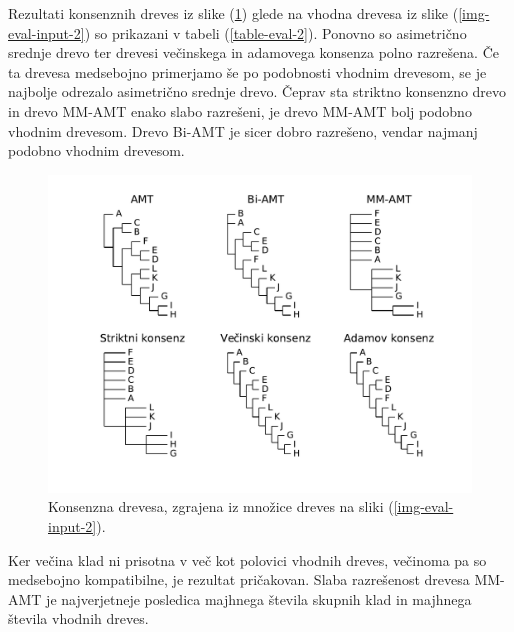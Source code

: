 \documentclass[a4paper, 12pt]{book}
\begin{document}
Rezultati konsenznih dreves iz slike (\ref{img-eval-result-2}) glede na vhodna drevesa iz slike (\ref{img-eval-input-2}) so prikazani v tabeli (\ref{table-eval-2}). Ponovno so asimetrično srednje drevo ter drevesi večinskega in adamovega konsenza polno razrešena. Če ta drevesa medsebojno primerjamo še po podobnosti vhodnim drevesom, se je najbolje odrezalo asimetrično srednje drevo. Čeprav sta striktno konsenzno drevo in drevo MM-AMT enako slabo razrešeni, je drevo MM-AMT bolj podobno vhodnim drevesom. Drevo Bi-AMT je sicer dobro razrešeno, vendar 
najmanj podobno vhodnim drevesom. 

\begin{figure}[h!]
	\begin{center}
		\includegraphics[scale=0.65, clip=true, trim=1.5cm 1.5cm 1cm 0.8cm]{gfx/eval_gfx_2.pdf}
	\end{center}
	\caption{Konsenzna drevesa, zgrajena iz množice dreves na sliki (\ref{img-eval-input-2}).}
	\label{img-eval-result-2}
\end{figure}

Ker večina klad ni prisotna v več kot polovici vhodnih dreves, večinoma pa so medsebojno kompatibilne, je rezultat pričakovan. Slaba razrešenost drevesa MM-AMT je najverjetneje posledica majhnega števila skupnih klad in majhnega števila vhodnih dreves.   
\end{document}
